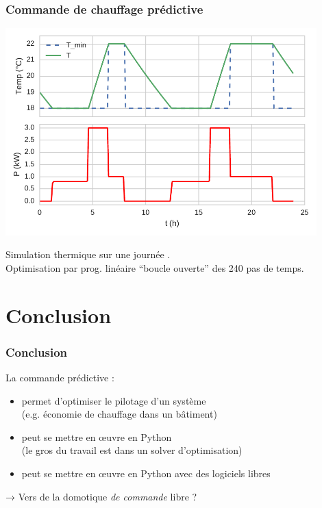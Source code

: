 \begin{frame}
  \frametitle{Commande de chauffage prédictive}

  \begin{center}
    \includegraphics[width=0.9\textwidth]{notebook/sim_linprog.pdf}
    
    \footnotesize
     Simulation thermique sur une journée .\\
     Optimisation par prog. linéaire ``boucle ouverte'' des 240 pas de temps.
  \end{center}
\end{frame}


\section{Conclusion}



\begin{frame}[c]
  \frametitle{Conclusion}
  
  \begin{block}{La commande prédictive :}
  \begin{itemize}
   \item permet d'optimiser le pilotage d'un système\\ (e.g. économie de chauffage dans un bâtiment)
   \item peut se mettre en œuvre en Python \\(le gros du travail est dans un solver d'optimisation)
   \item peut se mettre en œuvre en Python avec des logiciels libres
  \end{itemize}
  \end{block}
  
  \pause
  \begin{block}{}
   → Vers de la domotique \emph{de commande} libre ?
  \end{block}


  
\end{frame}

